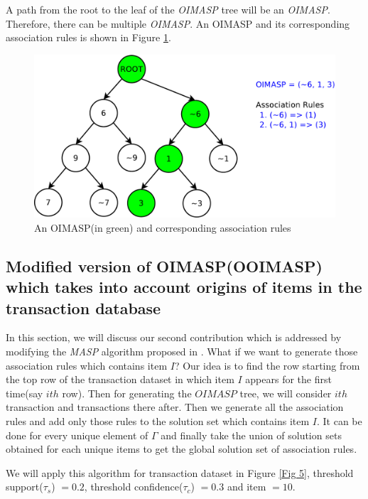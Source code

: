 \documentclass[review]{elsarticle}
\begin{document}
A path from the root to the leaf of the \emph{OIMASP} tree will be an \emph{OIMASP}. Therefore, there can be multiple \emph{OIMASP}. An OIMASP and its corresponding association rules is shown in Figure \ref{Fig 7}.

\begin{figure}
\begin{center}
\includegraphics[scale=0.35]{pdf/oimasp}
\end{center}
\caption{An OIMASP(in green) and corresponding association rules}
\label{Fig 7}
\end{figure}

\subsection{Modified version of OIMASP(OOIMASP) which takes into account origins of items in the transaction database}
In this section, we will discuss our second contribution which is addressed by modifying the \emph{MASP} algorithm proposed in \cite{oldmasp}. What if we want to generate those association rules which contains item $ I $? Our idea is to find the row starting from the top row of the transaction dataset in which item $ I $ appears for the first time(say $ ith $ row). Then for generating the $ OIMASP $ tree, we will consider $ ith $ transaction and transactions there after. Then we generate all the association rules and add only those rules to the solution set which contains item $ I $. It can be done for every unique element of $ \Gamma $ and finally take the union of solution sets obtained for each unique items to get the global solution set of association rules.

We will apply this algorithm for transaction dataset in Figure \ref{Fig 5}, threshold support($ \tau _{s} $) $ = 0.2 $, threshold confidence($ \tau _{c} $) $ = 0.3 $ and item $ = 10 $.
\end{document}
